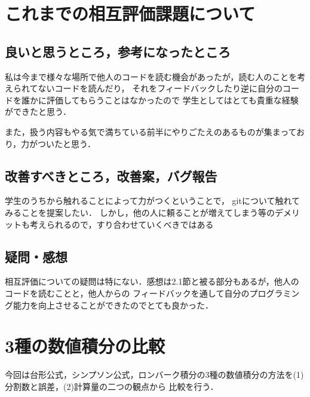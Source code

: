 \documentclass[titlepage]{jsarticle}
\begin{document}
\section{これまでの相互評価課題について}
\subsection{良いと思うところ，参考になったところ}
私は今まで様々な場所で他人のコードを読む機会があったが，読む人のことを考えられてないコードを読んだり，
それをフィードバックしたり逆に自分のコードを誰かに評価してもらうことはなかったので
学生としてはとても貴重な経験ができたと思う．

また，扱う内容もやる気で満ちている前半にやりごたえのあるものが集まっており，力がついたと思う．

\subsection{改善すべきところ，改善案，バグ報告}
学生のうちから触れることによって力がつくということで，
gitについて触れてみることを提案したい．
しかし，他の人に頼ることが増えてしまう等のデメリットも考えられるので，すり合わせていくべきではある

\subsection{疑問・感想}
相互評価についての疑問は特にない．感想は2.1節と被る部分もあるが，他人のコードを読むことと，他人からの
フィードバックを通して自分のプログラミング能力を向上させることができたのでとても良かった．


\section{3種の数値積分の比較}
今回は台形公式，シンプソン公式，ロンバーク積分の3種の数値積分の方法を(1)分割数と誤差，(2)計算量の二つの観点から
比較を行う．
\end{document}

